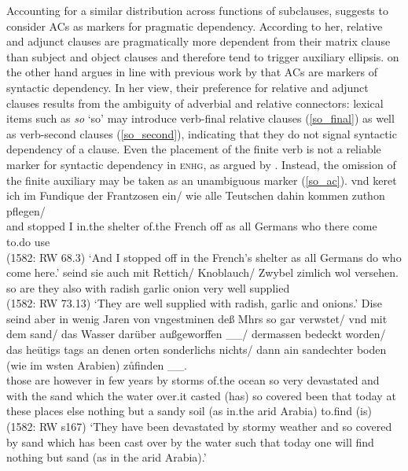 \documentclass[output=paper,colorlinks,citecolor=brown]{langscibook}
\begin{document}
\largerpage
Accounting for a similar distribution across functions of subclauses, \citet[139ff.]{breitbarth2005} suggests to consider ACs as markers for pragmatic dependency. According to her, relative and adjunct clauses are pragmatically more dependent from their matrix clause than subject and object clauses and therefore tend to trigger auxiliary ellipsis. \citet{demske90} on the other hand argues in line with previous work by \citet{admoni67} that ACs are markers of syntactic dependency. In her view, their preference for relative and adjunct clauses results from the ambiguity of adverbial and relative connectors: lexical items such as \textit{so} `so' may introduce verb-final relative clauses (\ref{so_final}) as well as verb-second clauses (\ref{so_second}), indicating that they do not signal syntactic dependency of a clause. Even the placement of the finite verb is not a reliable marker for syntactic dependency in \textsc{enhg}, as argued by \textcite{demske2018}. Instead, the omission of the finite auxiliary may be taken as an unambiguous marker (\ref{so_ac}).   
\eal
\ex \label{so_final}
\gll vnd keret ich im Fundique der Frantzosen ein/ wie alle Teutschen  dahin kommen zuthon pflegen/ \\ and stopped I in.the shelter {of.the} French off as all Germans who there come to.do use   \\ \hfill (1582: RW 68.3)
\glt `And I stopped off in the French's shelter as all Germans do who come here.'
\ex \label{so_second}
\gll {} seind sie auch mit Rettich/ Knoblauch/ Zwybel zimlich wol versehen.\\ so are they also with radish garlic onion very well supplied   \\ \hfill (1582: RW 73.13)
\glt `They are well supplied with radish, garlic and onions.'
\ex \label{so_ac}
\gll  Dise seind aber in wenig Jaren von vngest\oldue{}minen deß M\oldoe{}hrs so gar verw\oldue{}stet/ vnd mit dem sand/  das Wasser darüber außgeworffen \_\_/ dermassen bedeckt worden/ das {heütigs tags} an denen orten sonderlichs nichts/ dann ain sandechter boden (wie im w\oldue{}sten Arabien) z\r{u}finden \_\_. \\ those are however in few years by storms of.the ocean so very devastated and with the sand which the water over.it casted (has) so covered been that today at these places else nothing but a sandy soil (as in.the arid Arabia) to.find (is)  \\  \hfill (1582: RW s167)
\glt `They have been devastated by stormy weather and so covered by sand which has been cast over by the water such that today one will find nothing but sand (as in the arid Arabia).'
\zl
\end{document}

